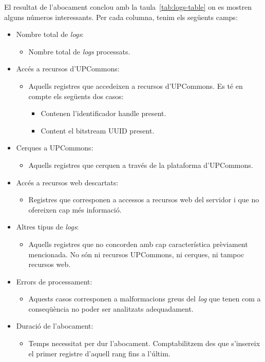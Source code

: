 \noindent
El resultat de l’abocament conclou amb la taula~\ref{tab:logs-table} on es mostren alguns números interessants.
Per cada columna, tenim els següents camps:

\begin{itemize}
    \item Nombre total de \textit{\gls{log}s}:
    \begin{itemize}
        \item Nombre total de \textit{logs} processats.
    \end{itemize}
    \item Accés a recursos d'\gls{UPCommons}:
    \begin{itemize}
        \item Aquells registres que accedeixen a recursos d’UPCommons. 
        Es té en compte els següents dos casos:
        \begin{itemize}
            \item Contenen l’identificador \gls{handle} present.
            \item Content el \gls{bitstream} \gls{UUID} present.
        \end{itemize}
    \end{itemize}
    \item Cerques a \gls{UPCommons}:
    \begin{itemize}
        \item Aquells registres que cerquen a través de la plataforma d’\gls{UPCommons}.
    \end{itemize}
    \item Accés a recursos web descartats:
    \begin{itemize}
        \item Registres que corresponen a accessos a recursos web del servidor i que no ofereixen cap més informació.
    \end{itemize}
    \item Altres tipus de \textit{logs}:
    \begin{itemize}
        \item Aquells registres que no concorden amb cap característica prèviament mencionada.
        No són ni recursos \gls{UPCommons}, ni cerques, ni tampoc recursos web.
    \end{itemize}
    \item Errors de processament:
    \begin{itemize}
        \item Aquests casos corresponen a malformacions greus del \textit{\gls{log}} que tenen com a conseqüència no poder ser analitzats adequadament.
    \end{itemize}
    \item Duració de l’abocament:
    \begin{itemize}
        \item Temps necessitat per dur l’abocament.
        Comptabilitzem des que s’insereix el primer registre d’aquell rang fins a l’últim.
    \end{itemize}
\end{itemize}